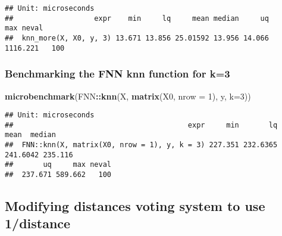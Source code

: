 \documentclass[]{article}
\newenvironment{Shaded}{\begin{snugshade}}{\end{snugshade}}
\newcommand{\DataTypeTok}[1]{\textcolor[rgb]{0.13,0.29,0.53}{#1}}
\newcommand{\DecValTok}[1]{\textcolor[rgb]{0.00,0.00,0.81}{#1}}
\newcommand{\KeywordTok}[1]{\textcolor[rgb]{0.13,0.29,0.53}{\textbf{#1}}}
\newcommand{\NormalTok}[1]{#1}
\newcommand{\OperatorTok}[1]{\textcolor[rgb]{0.81,0.36,0.00}{\textbf{#1}}}
\begin{document}
\begin{verbatim}
## Unit: microseconds
##                   expr    min     lq     mean median     uq      max neval
##  knn_more(X, X0, y, 3) 13.671 13.856 25.01592 13.956 14.066 1116.221   100
\end{verbatim}

\hypertarget{benchmarking-the-fnn-knn-function-for-k3}{%
\subsubsection{Benchmarking the FNN knn function for
k=3}\label{benchmarking-the-fnn-knn-function-for-k3}}

\begin{Shaded}
\begin{Highlighting}[]
\KeywordTok{microbenchmark}\NormalTok{(FNN}\OperatorTok{::}\KeywordTok{knn}\NormalTok{(X, }\KeywordTok{matrix}\NormalTok{(X0, }\DataTypeTok{nrow =} \DecValTok{1}\NormalTok{), y, }\DataTypeTok{k=}\DecValTok{3}\NormalTok{))}
\end{Highlighting}
\end{Shaded}

\begin{verbatim}
## Unit: microseconds
##                                         expr     min       lq     mean  median
##  FNN::knn(X, matrix(X0, nrow = 1), y, k = 3) 227.351 232.6365 241.6042 235.116
##       uq     max neval
##  237.671 589.662   100
\end{verbatim}

\hypertarget{modifying-distances-voting-system-to-use-1distance}{%
\subsection{Modifying distances voting system to use
1/distance}\label{modifying-distances-voting-system-to-use-1distance}}
\end{document}

